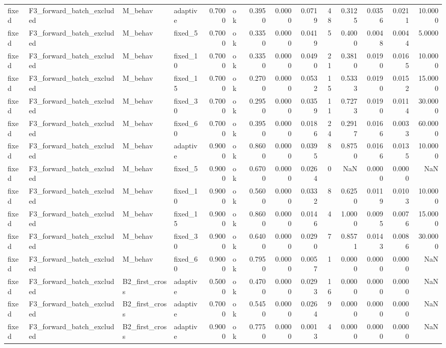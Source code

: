 \begin{table}
\begin{tabular}{llllrlrrrrrrrr}
fixed & F3\_forward\_batch\_excluded & M\_behav & adaptive & 0.7000 & ok & 0.3950 & 0.0000 & 0.0719 & 48 & 0.3125 & 0.0356 & 0.0211 & 10.0000 \\
fixed & F3\_forward\_batch\_excluded & M\_behav & fixed\_5 & 0.7000 & ok & 0.3350 & 0.0000 & 0.0419 & 5 & 0.4000 & 0.0048 & 0.0044 & 5.0000 \\
fixed & F3\_forward\_batch\_excluded & M\_behav & fixed\_10 & 0.7000 & ok & 0.3350 & 0.0000 & 0.0490 & 21 & 0.3810 & 0.0190 & 0.0165 & 10.0000 \\
fixed & F3\_forward\_batch\_excluded & M\_behav & fixed\_15 & 0.7000 & ok & 0.2700 & 0.0000 & 0.0532 & 15 & 0.5333 & 0.0190 & 0.0152 & 15.0000 \\
fixed & F3\_forward\_batch\_excluded & M\_behav & fixed\_30 & 0.7000 & ok & 0.2950 & 0.0000 & 0.0359 & 11 & 0.7273 & 0.0190 & 0.0114 & 30.0000 \\
fixed & F3\_forward\_batch\_excluded & M\_behav & fixed\_60 & 0.7000 & ok & 0.3950 & 0.0000 & 0.0186 & 24 & 0.2917 & 0.0166 & 0.0033 & 60.0000 \\
fixed & F3\_forward\_batch\_excluded & M\_behav & adaptive & 0.9000 & ok & 0.8600 & 0.0000 & 0.0395 & 8 & 0.8750 & 0.0166 & 0.0135 & 10.0000 \\
fixed & F3\_forward\_batch\_excluded & M\_behav & fixed\_5 & 0.9000 & ok & 0.6700 & 0.0000 & 0.0264 & 0 & NaN & 0.0000 & 0.0000 & NaN \\
fixed & F3\_forward\_batch\_excluded & M\_behav & fixed\_10 & 0.9000 & ok & 0.5600 & 0.0000 & 0.0332 & 8 & 0.6250 & 0.0119 & 0.0103 & 10.0000 \\
fixed & F3\_forward\_batch\_excluded & M\_behav & fixed\_15 & 0.9000 & ok & 0.8600 & 0.0000 & 0.0146 & 4 & 1.0000 & 0.0095 & 0.0076 & 15.0000 \\
fixed & F3\_forward\_batch\_excluded & M\_behav & fixed\_30 & 0.9000 & ok & 0.6400 & 0.0000 & 0.0290 & 7 & 0.8571 & 0.0143 & 0.0086 & 30.0000 \\
fixed & F3\_forward\_batch\_excluded & M\_behav & fixed\_60 & 0.9000 & ok & 0.7950 & 0.0000 & 0.0057 & 1 & 0.0000 & 0.0000 & 0.0000 & NaN \\
fixed & F3\_forward\_batch\_excluded & B2\_first\_cross & adaptive & 0.5000 & ok & 0.4700 & 0.0000 & 0.0293 & 16 & 0.0000 & 0.0000 & 0.0000 & NaN \\
fixed & F3\_forward\_batch\_excluded & B2\_first\_cross & adaptive & 0.7000 & ok & 0.5450 & 0.0000 & 0.0264 & 9 & 0.0000 & 0.0000 & 0.0000 & NaN \\
fixed & F3\_forward\_batch\_excluded & B2\_first\_cross & adaptive & 0.9000 & ok & 0.7750 & 0.0000 & 0.0013 & 4 & 0.0000 & 0.0000 & 0.0000 & NaN \\

\end{tabular}
\end{table}
